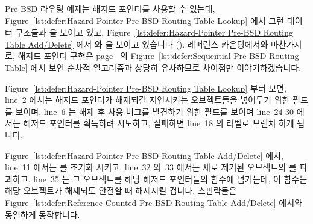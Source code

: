 Pre-BSD 라우팅 예제는 해저드 포인터를 사용할 수 있는데,
Figure~\ref{lst:defer:Hazard-Pointer Pre-BSD Routing Table Lookup}
에서 그런 데이터 구조들과  을 보이고 있고,
Figure~\ref{lst:defer:Hazard-Pointer Pre-BSD Routing Table Add/Delete}
에서  와  을 보이고 있습니다
().
레퍼런스 카운팅에서와 마찬가지로, 해저드 포인터 구현은
page~\pageref{lst:defer:Sequential Pre-BSD Routing Table} 의
Figure~\ref{lst:defer:Sequential Pre-BSD Routing Table} 에서 보인 순차적
알고리즘과 상당히 유사하므로 차이점만 이야기하겠습니다.

Figure~\ref{lst:defer:Hazard-Pointer Pre-BSD Routing Table Lookup} 부터 보면,
line~2 에서는 해저드 포인터가 해제되길 지연시키는 오브젝트들을 넣어두기 위한
 필드를 보이며, line~6 는 해제 후 사용 버그를 발견하기 위한
 필드를 보이며 line~24-30 에서는 해저드 포인터를 획득하려
시도하고, 실패하면 line~18 의  라벨로 브랜치 하게 됩니다.

Figure~\ref{lst:defer:Hazard-Pointer Pre-BSD Routing Table Add/Delete}
에서, line~11 에서는  를 초기화 시키고, line~32 와~33 에서는
새로 제거된 오브젝트의  를 파괴하고, line~35 는 그 오브젝트를
해당 해저드 포인터들의  함수에 넘기는데, 이 함수는 해당
오브젝트가 해제되도 안전할 때 해제시킬 겁니다.
스핀락들은
Figure~\ref{lst:defer:Reference-Counted Pre-BSD Routing Table Add/Delete}
에서와 동일하게 동작합니다.
\iffalse

